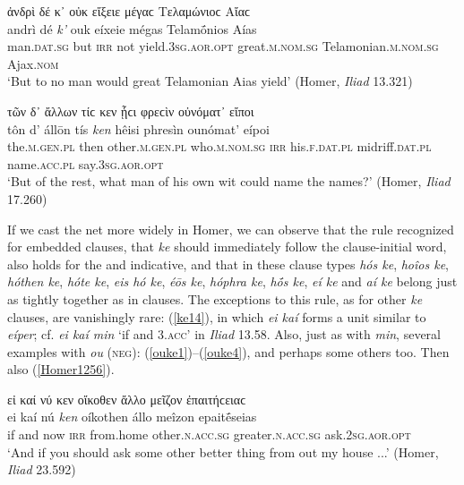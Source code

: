 \begin{exe}
\ex ἀνδρὶ δέ κ᾽ οὐκ εἴξειε μέγαϲ Τελαμώνιοϲ Αἴαϲ\\
\gll andrì dé \emph{k'} ouk eíxeie mégas Telamṓnios Aías\\
man.\textsc{dat.sg} but \textsc{irr} not yield.\textsc{3sg.aor.opt}
great.\textsc{m.nom.sg} Telamonian.\textsc{m.nom.sg} Ajax.\textsc{nom}\\
\trans `But to no man would great Telamonian Aias yield' (Homer, \textit{Iliad} 13.321)
\label{ke12}
\end{exe}

\begin{exe}
\ex τῶν δ᾽ ἄλλων τίϲ κεν ᾗϲι φρεϲὶν οὐνόματ᾽ εἴποι\\
\gll tôn d' állōn tís \emph{ken} hêisi phresìn ounómat' eípoi\\
the.\textsc{m.gen.pl} then other.\textsc{m.gen.pl} who.\textsc{m.nom.sg} \textsc{irr} his.\textsc{f.dat.pl} midriff.\textsc{dat.pl} name.\textsc{acc.pl}
say.\textsc{3sg.aor.opt}\\
\trans `But of the rest, what man of his own wit could name the names?' (Homer, \textit{Iliad} 17.260)
\label{ke13}
\end{exe}

If we cast the net more widely in Homer, we can observe that the rule recognized for  embedded clauses, that \textit{ke} should immediately follow the clause-initial word, also holds for the  and indicative, and that in these clause types \textit{hós ke}, \textit{hoîos ke}, \textit{hóthen ke}, \textit{hóte ke}, \textit{eis hó ke}, \textit{éōs ke}, \textit{hóphra ke}, \textit{hṓs ke}, \textit{eí ke} and \textit{aí ke} belong just as tightly together as in  clauses. The exceptions to this rule, as for other \textit{ke} clauses, are vanishingly rare: (\ref{ke14}), in which \textit{ei kaí} forms a unit similar to \textit{eíper}; cf. \textit{ei kaí min} `if and \textsc{3.acc}' in \textit{Iliad} 13.58. Also, just as with \textit{min}, several examples with \textit{ou} (\textsc{neg}): (\ref{ouke1})--(\ref{ouke4}), and perhaps some others too. Then also (\ref{Homer1256}).

\begin{exe}
\ex εἰ καί νύ κεν οἴκοθεν ἄλλο μεῖζον ἐπαιτήϲειαϲ\\
\gll ei kaí nú \emph{ken} oíkothen állo meîzon epaitḗseias\\
if and now \textsc{irr} from.home other.\textsc{n.acc.sg} greater.\textsc{n.acc.sg} ask.\textsc{2sg.aor.opt}\\
\trans `And if you should ask some other better thing from out my house ...' (Homer, \textit{Iliad} 23.592)
\label{ke14}
\end{exe}

